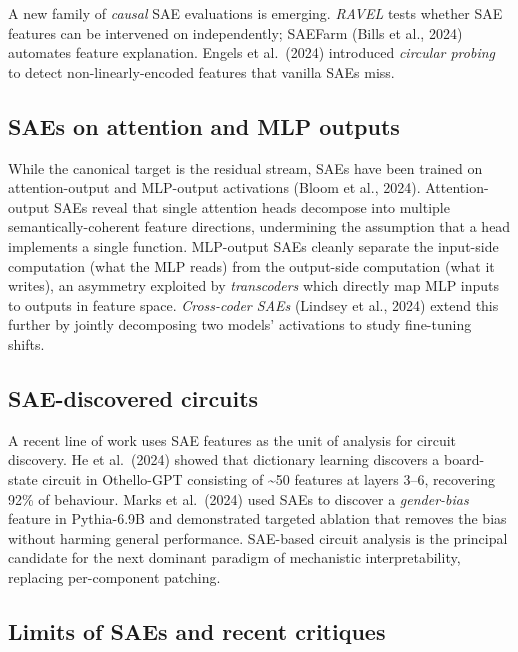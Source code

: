 \documentclass{article}
\begin{document}
A new family of \emph{causal} SAE evaluations is emerging. \emph{RAVEL} \citep{huang2023asurveyonhallucina} tests whether SAE features can be intervened on independently; SAEFarm (Bills et al., 2024) automates feature explanation. Engels et al.~(2024) introduced \emph{circular probing} to detect non-linearly-encoded features that vanilla SAEs miss.

\subsection{SAEs on attention and MLP outputs}\label{saes-on-attention-and-mlp-outputs}

While the canonical target is the residual stream, SAEs have been trained on attention-output \citep{kissane2024interpretingattent} and MLP-output activations (Bloom et al., 2024). Attention-output SAEs reveal that single attention heads decompose into multiple semantically-coherent feature directions, undermining the assumption that a head implements a single function. MLP-output SAEs cleanly separate the input-side computation (what the MLP reads) from the output-side computation (what it writes), an asymmetry exploited by \emph{transcoders} \citep{dunefsky2025oneshotoptimizedst} which directly map MLP inputs to outputs in feature space. \emph{Cross-coder SAEs} (Lindsey et al., 2024) extend this further by jointly decomposing two models' activations to study fine-tuning shifts.

\subsection{SAE-discovered circuits}\label{sae-discovered-circuits}

A recent line of work uses SAE features as the unit of analysis for circuit discovery. He et al.~(2024) showed that dictionary learning discovers a board-state circuit in Othello-GPT consisting of \textasciitilde50 features at layers 3--6, recovering 92\% of behaviour. Marks et al.~(2024) used SAEs to discover a \emph{gender-bias} feature in Pythia-6.9B and demonstrated targeted ablation that removes the bias without harming general performance. SAE-based circuit analysis is the principal candidate for the next dominant paradigm of mechanistic interpretability, replacing per-component patching.

\subsection{Limits of SAEs and recent critiques}\label{limits-of-saes-and-recent-critiques}
\end{document}
